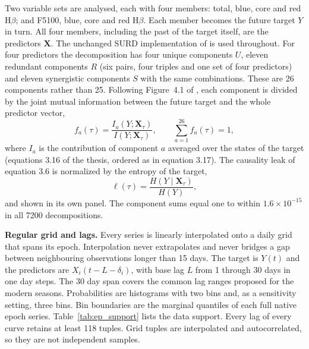 Two variable sets are analysed, each with four members: total, blue, core and
red H$\beta$; and F5100, blue, core and red H$\beta$. Each member becomes the
future target $Y$ in turn. All four members, including the past of the target
itself, are the predictors $\mathbf{X}$. The unchanged SURD implementation of
\citet{MartinezSanchez2024SURD} is used throughout. For four predictors the decomposition has
four unique components $U$, eleven redundant components $R$ (six pairs, four
triples and one set of four predictors) and eleven synergistic components $S$
with the same combinations. These are 26 components rather than 25. Following
Figure~4.1 of \citet{MartinezSanchez2025Thesis}, each component is divided by the joint mutual
information between the future target and the whole predictor vector,
\begin{equation}
 f_a(\tau)=\frac{I_a(Y;\mathbf{X}_{\tau})}{I(Y;\mathbf{X}_{\tau})},
 \qquad \sum_{a=1}^{26}f_a(\tau)=1 ,
 \label{eq:ep_component_normalization}
\end{equation}
where $I_a$ is the contribution of component $a$ averaged over the states of the
target (equations 3.16 of the thesis, ordered as in equation 3.17). The causality
leak of equation 3.6 is normalized by the entropy of the target,
\begin{equation}
 \ell(\tau)=\frac{H(Y\mid\mathbf{X}_{\tau})}{H(Y)} ,
 \label{eq:ep_leakage}
\end{equation}
and shown in its own panel. The component sums equal one to within
$1.6\times10^{-15}$ in all 7200 decompositions.

\textbf{Regular grid and lags.} Every series is linearly interpolated onto a
daily grid that spans its epoch. Interpolation never extrapolates and never
bridges a gap between neighbouring observations longer than 15 days. The target
is $Y(t)$ and the predictors are $X_i(t-L-\delta_i)$, with base lag $L$ from 1
through 30 days in one day steps. The 30 day span covers the common lag ranges
proposed for the modern seasons. Probabilities are histograms with two bins and,
as a sensitivity setting, three bins. Bin boundaries are the marginal quantiles
of each full native epoch series. Table~\ref{tab:ep_support} lists the data
support. Every lag of every curve retains at least 118 tuples. Grid tuples are
interpolated and autocorrelated, so they are not independent samples.

\begin{SURDtable}
\centering
\caption{Data support per epoch. $N_F$ and $N_{\rm line}$ are the numbers of
native continuum and spectroscopic dates; the line number is the same for the
total, blue, core and red series. The last column gives the range over lags and
targets of the daily grid tuples with all five series available (common lags,
two bins).}
\label{tab:ep_support}
\small

\end{SURDtable}

